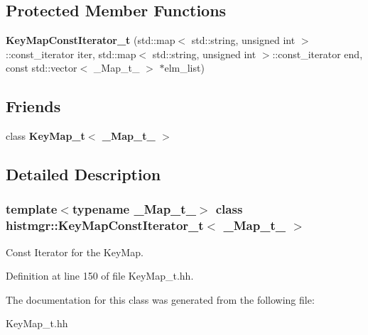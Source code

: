 \subsection*{Protected Member Functions}
\begin{DoxyCompactItemize}
\item 
{\bfseries KeyMapConstIterator\_\-t} (std::map$<$ std::string, unsigned int $>$::const\_\-iterator iter, std::map$<$ std::string, unsigned int $>$::const\_\-iterator end, const std::vector$<$ \_\-Map\_\-t\_\- $>$ $\ast$elm\_\-list)\label{classhistmgr_1_1KeyMapConstIterator__t_a6558bc7bfcfb2688625a19ca1638c25e}

\end{DoxyCompactItemize}
\subsection*{Friends}
\begin{DoxyCompactItemize}
\item 
class {\bfseries KeyMap\_\-t$<$ \_\-Map\_\-t\_\- $>$}\label{classhistmgr_1_1KeyMapConstIterator__t_a191ea493c1085e4505ff75fc2371f4fc}

\end{DoxyCompactItemize}


\subsection{Detailed Description}
\subsubsection*{template$<$typename \_\-Map\_\-t\_\-$>$ class histmgr::KeyMapConstIterator\_\-t$<$ \_\-Map\_\-t\_\- $>$}

Const Iterator for the KeyMap. 

Definition at line 150 of file KeyMap\_\-t.hh.

The documentation for this class was generated from the following file:\begin{DoxyCompactItemize}
\item 
KeyMap\_\-t.hh\end{DoxyCompactItemize}
